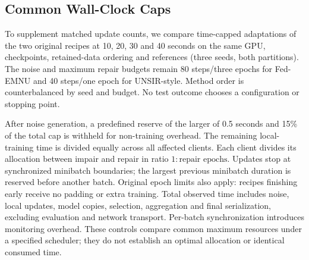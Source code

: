 \subsection{Common Wall-Clock Caps}
\label{sec:walltime}
To supplement matched update counts, we compare time-capped adaptations of the
two original recipes at 10, 20, 30 and 40 seconds on the same GPU, checkpoints,
retained-data ordering and references (three seeds, both partitions). The
noise and maximum repair budgets remain 80 steps/three epochs for Fed-EMNU and
40 steps/one epoch for UNSIR-style. Method order is counterbalanced by seed
and budget. No test outcome chooses a configuration or stopping point.

After noise generation, a predefined reserve of the larger of 0.5 seconds and
15\% of the total cap is withheld for non-training overhead. The remaining
local-training time is divided equally across all affected clients. Each
client divides its allocation between impair and repair in ratio
$1:\text{repair epochs}$. Updates stop at synchronized minibatch boundaries;
the largest previous minibatch duration is reserved before another batch.
Original epoch limits also apply: recipes finishing early receive no padding
or extra training. Total observed time includes noise, local updates, model
copies, selection, aggregation and final serialization, excluding evaluation
and network transport. Per-batch synchronization introduces monitoring overhead.
These controls compare common maximum resources under a specified scheduler;
they do not establish an optimal allocation or identical consumed time.
